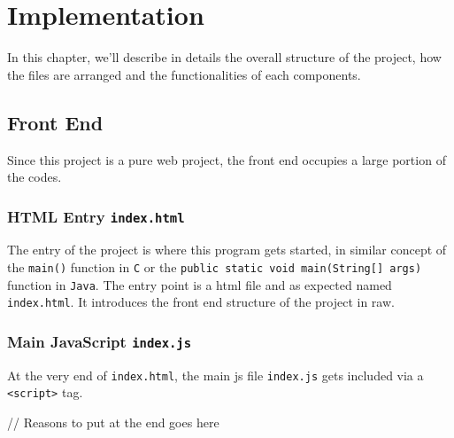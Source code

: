 
\chapter{Implementation} %

\label{Chapter4} %

In this chapter, we'll describe in details the overall structure of the project, how the files are arranged and the functionalities of each components.


\section{Front End}

Since this project is a pure web project, the front end occupies a large portion of the codes.

\subsection{HTML Entry \texttt{index.html}}

The entry of the project is where this program gets started, in similar concept of the \texttt{main()} function in \texttt{C} or the \texttt{public static void main(String[] args)} function in \texttt{Java}. The entry point is a \gls{html} file and as expected named \texttt{index.html}. It introduces the front end structure of the project in raw.


\subsection{Main JavaScript \texttt{index.js}}

At the very end of \texttt{index.html}, the main \gls{js} file \texttt{index.js} gets included via a \texttt{<script>} tag.

// Reasons to put at the end goes here


